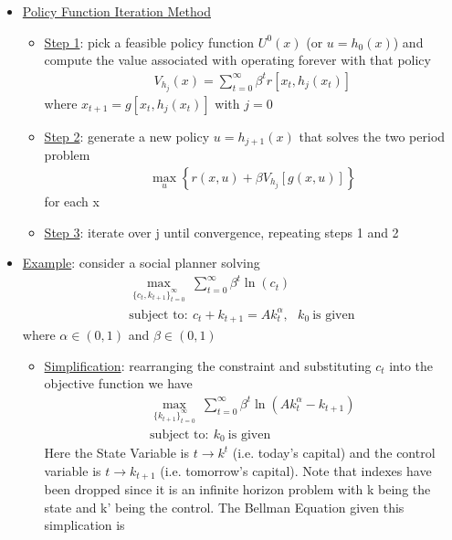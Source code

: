 \documentclass{article}
\begin{document}
\begin{itemize}
\begin{itemize}
    \end{itemize}
    \item  \underline{Policy Function Iteration Method}
    \begin{itemize}
        \item  \underline{Step 1}: pick a feasible policy function $U^{0}(x)$ (or $u = h_{0}(x)$) and compute the value associated with operating forever with that policy
        \begin{gather*}
            V_{h_{j}}(x) = \sum_{t=0}^{\infty} \beta^{t} r [x_{t}, h_{j}(x_{t})]
        \end{gather*}
        where $x_{t+1} = g[x_{t}, h_{j}(x_{t})]$ with $j=0$
        \item  \underline{Step 2}: generate a new policy $u = h_{j+1}(x)$ that solves the two period problem
        \begin{gather*}
            \max_{u} \left\{r(x,u) + \beta V_{h_{j}} [g(x,u)]\right\}
        \end{gather*}
        for each x
        \item  \underline{Step 3}: iterate over j until convergence, repeating steps 1 and 2
    \end{itemize}
    \item  \underline{Example}: consider a social planner solving
    \begin{gather*}
    \max_{\{c_{t}, k_{t+1} \}_{t=0}^{\infty}} \ \sum_{t=0}^{\infty} \beta^{t} \ln (c_{t}) \\
    \text{subject to}: \ c_{t} + k_{t+1} = Ak_{t}^{\alpha}, \ \ \ k_{0} \ \text{is given}
    \end{gather*}
    where $\alpha \in (0,1)$ and $\beta \in (0,1)$
    \begin{itemize}
        \item \underline{Simplification}: rearranging the constraint and substituting $c_{t}$ into the objective function we have
        \begin{gather*}
        \max_{\{k_{t+1} \}_{t=0}^{\infty}} \ \sum_{t=0}^{\infty} \beta^{t} \ln (Ak_{t}^{\alpha} − k_{t+1}) \\
        \text{subject to}: \ k_{0} \ \text{is given}
        \end{gather*}
        Here the State Variable is $t \rightarrow k^{t}$ (i.e. today's capital) and the control variable is $t \rightarrow k_{t+1}$ (i.e. tomorrow's capital). Note that indexes have been dropped since it is an infinite horizon problem with k being the state and k' being the control. The Bellman Equation given this simplication is

\end{itemize}
\end{itemize}
\end{document}
